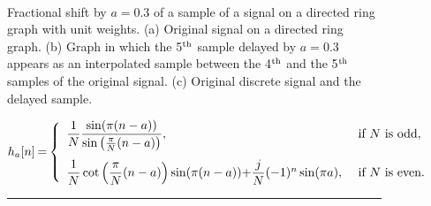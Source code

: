 \begin{figure}[b]
	\centering
	\\
	\caption{Fractional shift by $a=0{.}3 $ of a sample of a signal on a directed ring graph with unit weights. (a) Original signal on a directed ring graph. (b) Graph in which the 5$\textsuperscript{th}$ sample delayed by $a=0{.}3 $ appears as an interpolated sample between the 4$\textsuperscript{th}$ and the 5$\textsuperscript{th}$ samples of the original signal. (c) Original discrete signal and the delayed sample.}
	\label{fig:frac_delay_directed}
\end{figure}

\begin{figure}[h!]
\begin{equation}\label{eq:DFT_inversa_autovalores}
h_a[n]\hspace{-0.03cm}=\hspace{-0.03cm}
\left\{\begin{array}{ll}
{\dfrac{1}{N}} \dfrac{\sin (\pi (n-a))}{\sin \left(\frac{\pi}{N} (n-a)\right)}, &\text{ if $N$ is odd},\vspace{0.25cm}\\
{\dfrac{1}{N} \cot \left(\dfrac{\pi}{N} (n-a)\right) \sin (\pi (n-a))}{+ \dfrac{j}{N} (-1)^n \sin (\pi a)}, &\text{ if } N \text{ is even}.
\end{array}\right.
\end{equation}
\hrule
\end{figure}

